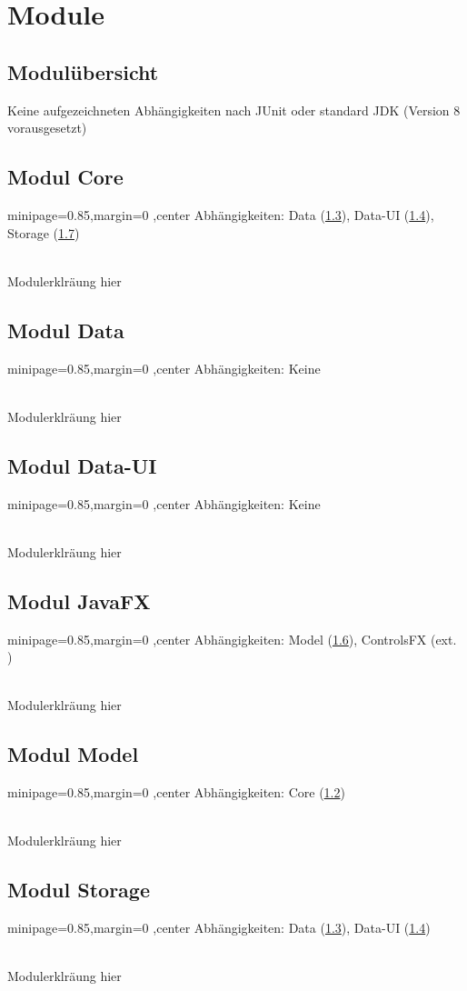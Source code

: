 
\section{Module}
\newcommand{\depBox}[1]{
	\begin{adjustbox}{minipage=0.85\textwidth,margin=0 \smallskipamount,center}
		Abhängigkeiten:	 \quad #1
	\end{adjustbox} ~\\
}

\subsection{Modulübersicht}
Keine aufgezeichneten Abhängigkeiten nach JUnit oder standard JDK (Version 8 vorausgesetzt)




\subsection{Modul Core}
\label{mod_core}
\depBox{Data (\ref{mod_data}), Data-UI (\ref{mod_data-ui}), Storage (\ref{mod_storage})}

Modulerklräung hier




\subsection{Modul Data}
\label{mod_data}
\depBox{Keine}

Modulerklräung hier




\subsection{Modul Data-UI}
\label{mod_data-ui}
\depBox{Keine}

Modulerklräung hier




\subsection{Modul JavaFX}
\label{mod_javafx}
\depBox{Model (\ref{mod_model}), ControlsFX (ext. \cite{controlsfx})}

Modulerklräung hier




\subsection{Modul Model}
\label{mod_model}
\depBox{Core (\ref{mod_core})}

Modulerklräung hier




\subsection{Modul Storage}
\label{mod_storage}
\depBox{Data (\ref{mod_data}), Data-UI (\ref{mod_data-ui})}

Modulerklräung hier

